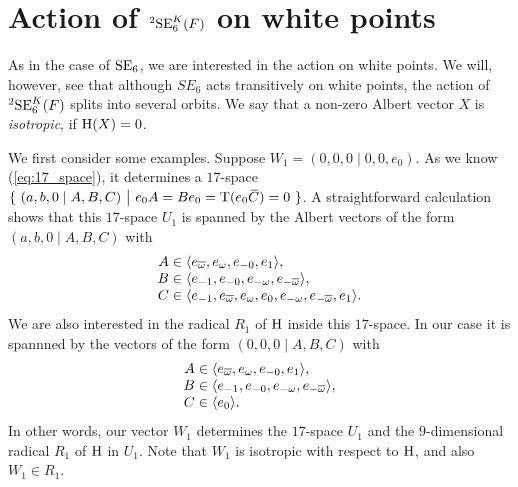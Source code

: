 \section{Action of ${}^2\mathrm{SE}_6^K(F)$ on white points}

As in the case of $\mathrm{SE}_6$, we are interested in the action on white points. We will, however, see 
that although $SE_6$ acts transitively on white points, the action of ${}^2\mathrm{SE}_6^K(F)$ splits
into several orbits. We say that a non-zero Albert vector $X$ is \textit{isotropic}, if
$\mathrm{H}(X) = 0$. 

We first consider some examples. Suppose $W_1 = (0,0,0\mid 0,0,e_0)$. As we know (\ref{eq:17_space}), 
it determines 
a $17$-space $	\{\ (a,b,0 \mid A,B,C)\ \big|\ e_0 A = B e_0 = \operatorname{T}(e_0 \mathord{\mbox{\hspace*{0pt}}\,\overline{\!C\!\!\;}\!\:}\mbox{\hspace*{0pt}}) = 0\ \}$. A
straightforward calculation shows that
this $17$-space $U_1$ is spanned by the Albert vectors of the form \mbox{$(a,b,0\mid A,B,C)$} with
\begin{equation}
	\begin{array}{r@{\;}c@{\;}l}
		A & \in & \langle e_{\bar{\omega}}, e_{\omega}, e_{-0}, e_1 \rangle, \\
		B & \in & \langle e_{-1}, e_{-0}, e_{-\omega}, e_{-\bar{\omega}} \rangle, \\
		C & \in & \langle e_{-1}, e_{\bar{\omega}}, e_{\omega}, e_0, e_{-\omega}, e_{-\bar{\omega}}, e_1
		\rangle.
	\end{array}
\end{equation}
We are also interested in the radical $R_1$ of $\mathrm{H}$ inside this $17$-space. In our case it is spannned
by the vectors of the form \mbox{$(0,0,0\mid A,B,C)$} with
\begin{equation}
	\begin{array}{r@{\;}c@{\;}l}
		A & \in & \langle e_{\bar{\omega}}, e_{\omega}, e_{-0}, e_1 \rangle, \\
		B & \in & \langle e_{-1}, e_{-0}, e_{-\omega}, e_{-\bar{\omega}} \rangle, \\
		C & \in & \langle e_0 \rangle.
	\end{array}
\end{equation}
In other words, our vector $W_1$ determines the $17$-space $U_1$ and the $9$-dimensional radical $R_1$ 
of $\mathrm{H}$ in $U_1$. Note that $W_1$ is isotropic with respect to $\mathrm{H}$, and also $W_1 \in R_1$. 

